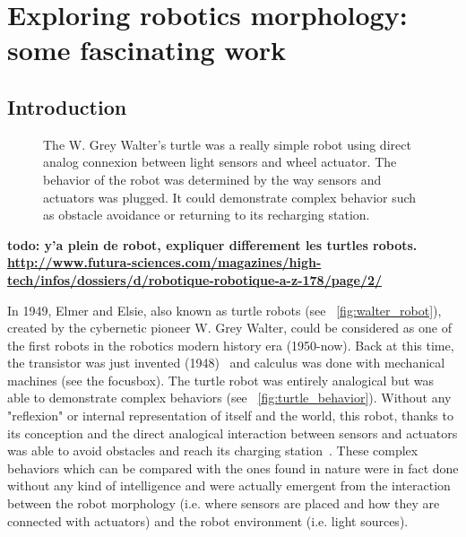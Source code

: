 
\cleartoleftpage



\chapter{Exploring robotics morphology: some fascinating work} %


\section{Introduction} %

\begin{figure}[!b]
\centering
    \hfil
    \caption{The W. Grey Walter's turtle was a really simple robot using direct analog connexion between light sensors and wheel actuator. The behavior of the robot was determined by the way sensors and actuators was plugged. It could demonstrate complex behavior such as obstacle avoidance or returning to its recharging station.}
    \label{fig:turtle_robot}
\end{figure}


\textbf{todo: y'a plein de robot, expliquer differement les turtles robots. \url{http://www.futura-sciences.com/magazines/high-tech/infos/dossiers/d/robotique-robotique-a-z-178/page/2/}}


In 1949, Elmer and Elsie, also known as turtle robots (see \figurename~\ref{fig:walter_robot}), created by the cybernetic pioneer W. Grey Walter, could be considered as one of the first robots in the robotics modern history era (1950-now). Back at this time, the transistor was just invented (1948)~\cite{brinkman1997history} and calculus was done with mechanical machines (see the focusbox). The turtle robot was entirely analogical but was able to demonstrate complex behaviors (see \figurename~\ref{fig:turtle_behavior}). Without any "reflexion" or internal representation of itself and the world, this robot, thanks to its conception and the direct analogical interaction between sensors and actuators was able to avoid obstacles and reach its charging station~\cite{walter1950imitation}.
These complex behaviors which can be compared with the ones found in nature were in fact done without any kind of intelligence and were actually emergent from the interaction between the robot morphology (i.e. where sensors are placed and how they are connected with actuators) and the robot environment (i.e. light sources).

